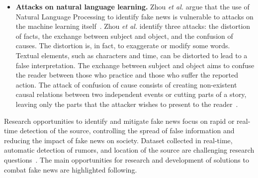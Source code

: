 \documentclass{ieeeaccess}
\begin{document}
\begin{itemize}
\item{\bf Attacks on natural language learning.} Zhou {\it et al.} argue that the use of Natural Language Processing to identify fake news is vulnerable to attacks on the machine learning itself~\cite{zhou-arxiv}. Zhou {\it et al.} identify three attacks: the distortion of facts, the exchange between subject and object, and the confusion of causes. The distortion is, in fact, to exaggerate or modify some words. Textual elements, such as characters and time, can be distorted to lead to a false interpretation. The exchange between subject and object aims to confuse the reader between those who practice and those who suffer the reported action. The attack of confusion of cause consists of creating non-existent causal relations between two independent events or cutting parts of a story, leaving only the parts that the attacker wishes to present to the reader~\cite{zhou-arxiv}.


\end{itemize}

Research opportunities to identify and mitigate fake news focus on rapid or real-time detection of the source, controlling the spread of false information and reducing the impact of fake news on society. Dataset collected in real-time, automatic detection of rumors, and location of the source are challenging research questions~\cite{meel2020}. The main opportunities for research and development of solutions to combat fake news are highlighted following.

\end{document}
